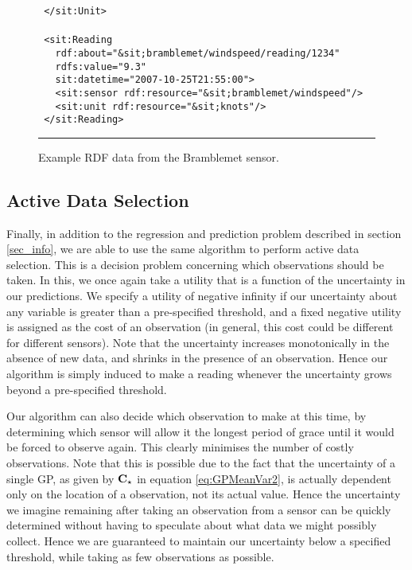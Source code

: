 \documentclass{acmtrans2m}
\begin{document}
\begin{figure}
\begin{minipage}{2.6in}
\begin{tabbing}
\tt\scriptsize \ </\color{magenta}sit:Unit\color{black}>\\
\\
\tt\scriptsize \ <\color{magenta}sit:Reading\color{black}\\
\tt\scriptsize \ \ \ rdf:about=\color{blue}"\&sit;bramblemet/windspeed/reading/1234"\color{black}\\
\tt\scriptsize \ \ \ rdfs:value=\color{blue}"9.3"\color{black}\\
\tt\scriptsize \ \ \ sit:datetime=\color{blue}"2007-10-25T21:55:00"\color{black}>\\
\tt\scriptsize \ \ \ <\color{magenta}sit:sensor\color{black}~rdf:resource=\color{blue}"\&sit;bramblemet/windspeed"\color{black}/>\\
\tt\scriptsize \ \ \ <\color{magenta}sit:unit\color{black}~rdf:resource=\color{blue}"\&sit;knots"\color{black}/>\\
\tt\scriptsize \ </\color{magenta}sit:Reading\color{black}>\\
\normalsize
\end{tabbing}
\end{minipage}\par
\rule{3.3in}{.005in} 
\caption{Example RDF data from the Bramblemet sensor.}
\label{rdf}
\end{figure}

\subsection{Active Data Selection}

\noindent Finally, in addition to the regression and prediction problem described in section \ref{sec_info}, we are able to use the same algorithm to perform active data selection. This is a decision problem concerning which observations should be taken. In this, we once again take a utility that is a function of the uncertainty in our predictions. We specify a utility of negative infinity if our uncertainty about any variable is greater than a pre-specified threshold, and a fixed negative utility is assigned as the cost of an observation (in general, this cost could be different for different sensors). Note that the uncertainty increases monotonically in the absence of new data, and shrinks in the presence of an observation. Hence our algorithm is simply induced to make a reading whenever the uncertainty grows beyond a pre-specified threshold. 

Our algorithm can also decide which observation to make at this time, by determining which sensor will allow it the longest period of grace until it would be forced to observe again. This clearly minimises the number of costly observations. Note that this is possible due to the fact that the uncertainty of a single GP, as given by $\mathbf{C}_\star$ in equation \eqref{eq:GPMeanVar2}, is actually dependent only on the location of a observation, not its actual value. Hence the uncertainty we imagine remaining after taking an observation from a sensor can be quickly determined without having to speculate about what data we might possibly collect. Hence we are guaranteed to maintain our uncertainty below a specified threshold, while taking as few observations as possible.
\end{document}
